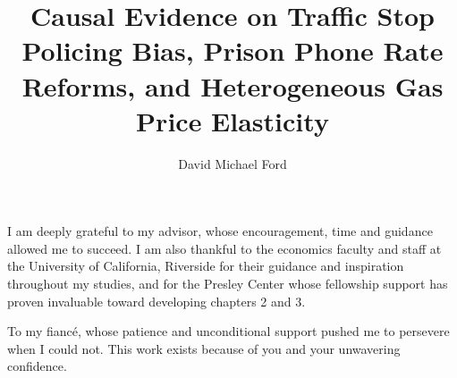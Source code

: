 \documentclass[oneside,final, letterpaper]{ucr}
\begin{document}
\title{Causal Evidence on Traffic Stop Policing Bias, Prison Phone Rate Reforms, and Heterogeneous Gas Price Elasticity}
\author{David Michael Ford}

\maketitle
\copyrightpage{}
\approvalpage{}


\begin{frontmatter}

\begin{acknowledgements}
I am deeply grateful to my advisor, whose encouragement, time and guidance allowed me to succeed. I am also thankful to the economics faculty and staff at the University of California, Riverside for their guidance and inspiration throughout my studies, and for the Presley Center whose fellowship support has proven invaluable toward developing chapters 2 and 3. 
\end{acknowledgements}

\begin{dedication}
\null\vfil
{\large
\begin{center}
To my fiancé, whose patience and unconditional support pushed me to persevere when I could not. This work exists because of you and your unwavering confidence. 
\end{center}}
\vfil\null
\end{dedication}



\newpage
\tableofcontents

\newpage
\listoffigures

\newpage
\listoftables

\end{frontmatter}




% 



%



\nocite{*}
% 




\end{document}

